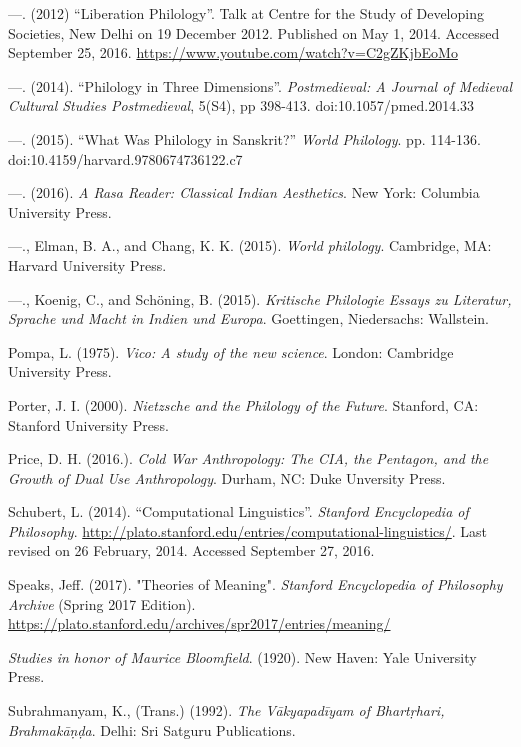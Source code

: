 \begin{thebibliography}{99}
  —. (2012) “Liberation Philology”. Talk at Centre for the Study of Developing Societies, New Delhi on 19 December 2012. Published on May 1, 2014. Accessed September 25, 2016. \url{https://www.youtube.com/watch?v=C2gZKjbEoMo}

  —. (2014). “Philology in Three Dimensions”. \textit{Postmedieval: A Journal of Medieval Cultural Studies Postmedieval}, 5(S4), pp 398-413. doi:10.1057/pmed.2014.33

  —. (2015). “What Was Philology in Sanskrit?” \textit{World Philology}. pp. 114-136. doi:10.4159/harvard.9780674736122.c7

  —. (2016). \textit{A Rasa Reader: Classical Indian Aesthetics}. New York: Columbia University Press.

  —., Elman, B. A., and Chang, K. K. (2015). \textit{World philology}. Cambridge, MA: Harvard University Press.

  —., Koenig, C., and Schöning, B. (2015). \textit{Kritische Philologie Essays zu Literatur, Sprache und Macht in Indien und Europa}. Goettingen, Niedersachs: Wallstein.

  Pompa, L. (1975). \textit{Vico: A study of the new science}. London: Cambridge University Press.

  Porter, J. I. (2000). \textit{Nietzsche and the Philology of the Future}. Stanford, CA: Stanford University Press.

  Price, D. H. (2016.). \textit{Cold War Anthropology: The CIA, the Pentagon, and the Growth of Dual Use Anthropology}. Durham, NC: Duke Unversity Press.

  Schubert, L. (2014). “Computational Linguistics”. \textit{Stanford Encyclopedia of Philosophy}. \url{http://plato.stanford.edu/entries/computational-linguistics/}. Last revised on 26 February, 2014. Accessed September 27, 2016.

  Speaks, Jeff. (2017). "Theories of Meaning". \textit{Stanford Encyclopedia of Philosophy Archive} (Spring 2017 Edition). \url{https://plato.stanford.edu/archives/spr2017/entries/meaning/}

  \textit{Studies in honor of Maurice Bloomfield}. (1920). New Haven: Yale University Press.

  Subrahmanyam, K., (Trans.) (1992). \textit{The Vākyapadīyam of Bhartṛhari, Brahmakāṇḍa}. Delhi: Sri Satguru Publications.


\end{thebibliography}
